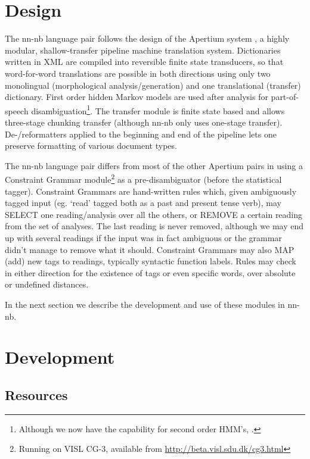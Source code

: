 \documentclass[11pt]{article}
\begin{document}
\section{Design}
\label{sec-2}

  \label{SEC:design}

The nn-nb language pair follows the design of the Apertium system
\citep{corbi05oss}, a highly modular, shallow-transfer pipeline
machine translation system. Dictionaries written in XML are compiled
into reversible finite state transducers, so that word-for-word
translations are possible in both directions using only two
monolingual (morphological analysis/generation) and one translational
(transfer) dictionary. First order hidden Markov models are used after
analysis for part-of-speech disambiguation\footnote{Although we now have the capability for second order HMM's,
\citep{todo_or_remove}. }. The transfer module
is finite state based and allows three-stage chunking transfer
(although nn-nb only uses one-stage transfer). De-/reformatters
applied to the beginning and end of the pipeline lets one preserve
formatting of various document types.

The nn-nb language pair differs from most of the other Apertium pairs
in using a Constraint Grammar module\footnote{Running on VISL CG-3, available from
\href{http://beta.visl.sdu.dk/cg3.html}{http://beta.visl.sdu.dk/cg3.html} } as a pre-disambiguator
(before the statistical tagger). Constraint Grammars
\citep{karlsson1990cgf} are hand-written rules which, given
ambiguously tagged input (eg. `read' tagged both as a past and present
tense verb), may SELECT one reading/analysis over all the others, or
REMOVE a certain reading from the set of analyses. The last reading is
never removed, although we may end up with several readings if the
input was in fact ambiguous or the grammar didn't manage to remove
what it should. Constraint Grammars may also MAP (add) new tags to
readings, typically syntactic function labels. Rules may check in
either direction for the existence of tags or even specific words,
over absolute or undefined distances.

In the next section we describe the development and use of these
modules in nn-nb.

\section{Development}
\label{sec-3}

  \label{SEC:development}
\subsection{Resources}
\label{sec-3.1}
\end{document}
